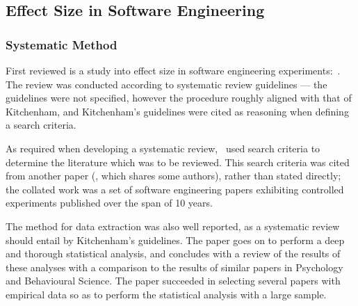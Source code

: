 \subsection{Effect Size in Software Engineering}
\subsubsection{Systematic Method}
First reviewed is a study into effect size in software engineering experiments:~\citet*{Kampenes2007}. The review was conducted according to systematic review guidelines --- the guidelines were not specified, however the procedure roughly aligned with that of Kitchenham, and Kitchenham's guidelines were cited as reasoning when defining a search criteria.\par

As required when developing a systematic review,~\cite{Kampenes2007} used search criteria to determine the literature which was to be reviewed. This search criteria was cited from another paper (\cite{Sjoberg2005}, which shares some authors), rather than stated directly; the collated work was a set of software engineering papers exhibiting controlled experiments published over the span of 10 years.\par

The method for data extraction was also well reported, as a systematic review should entail by Kitchenham's guidelines. The paper goes on to perform a deep and thorough statistical analysis, and concludes with a review of the results of these analyses with a comparison to the results of similar papers in Psychology and Behavioural Science. The paper succeeded in selecting several papers with empirical data so as to perform the statistical analysis with a large sample.\par

